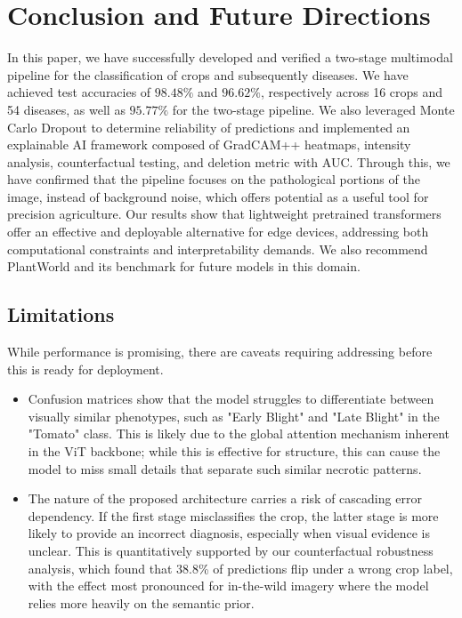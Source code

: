 \documentclass[runningheads]{llncs}
\begin{document}
\section{Conclusion and Future Directions}
\label{sec:conclusion}

In this paper, we have successfully developed and verified a two-stage multimodal pipeline for the classification of crops and subsequently diseases. We have achieved test accuracies of $98.48\%$ and $96.62\%$, respectively across 16 crops and 54 diseases, as well as $95.77\%$ for the two-stage pipeline. We also leveraged Monte Carlo Dropout to determine reliability of predictions and implemented an explainable AI framework composed of GradCAM++ heatmaps, intensity analysis, counterfactual testing, and deletion metric with AUC. Through this, we have confirmed that the pipeline focuses on the pathological portions of the image, instead of background noise, which offers potential as a useful tool for precision agriculture. Our results show that lightweight pretrained transformers offer an effective and deployable alternative for edge devices, addressing both computational constraints and interpretability demands. We also recommend PlantWorld and its benchmark for future models in this domain.

\subsection{Limitations}

While performance is promising, there are caveats requiring addressing before this is ready for deployment.

\begin{itemize}
    \item Confusion matrices show that the model struggles to differentiate between visually similar phenotypes, such as "Early Blight" and "Late Blight" in the "Tomato" class. This is likely due to the global attention mechanism inherent in the ViT backbone; while this is effective for structure, this can cause the model to miss small details that separate such similar necrotic patterns.
    \item The nature of the proposed architecture carries a risk of cascading error dependency. If the first stage misclassifies the crop, the latter stage is more likely to provide an incorrect diagnosis, especially when visual evidence is unclear. This is quantitatively supported by our counterfactual robustness analysis, which found that 38.8\% of predictions flip under a wrong crop label, with the effect most pronounced for in-the-wild imagery where the model relies more heavily on the semantic prior.
\end{itemize}
\end{document}
